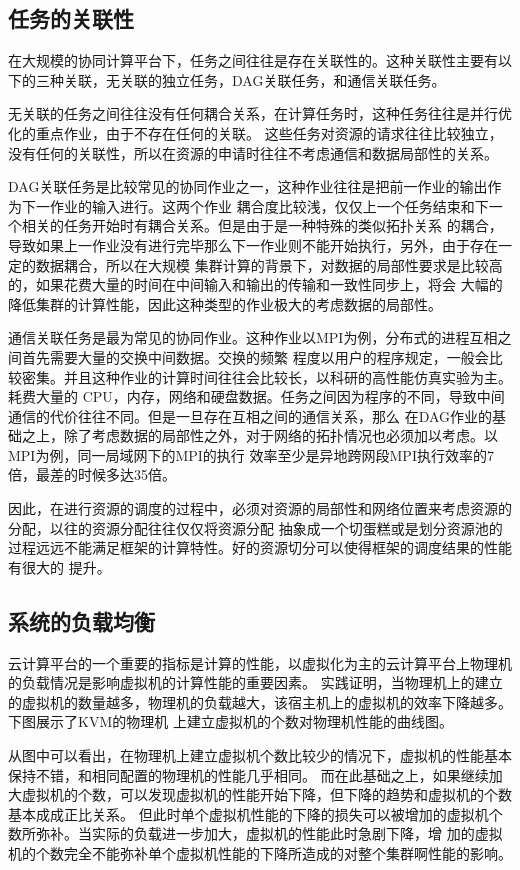 \subsection{任务的关联性}
在大规模的协同计算平台下，任务之间往往是存在关联性的。这种关联性主要有以下的三种关联，无关联的独立任务，DAG关联任务，和通信关联任务。

无关联的任务之间往往没有任何耦合关系，在计算任务时，这种任务往往是并行优化的重点作业，由于不存在任何的关联。
这些任务对资源的请求往往比较独立，没有任何的关联性，所以在资源的申请时往往不考虑通信和数据局部性的关系。

DAG关联任务是比较常见的协同作业之一，这种作业往往是把前一作业的输出作为下一作业的输入进行。这两个作业
耦合度比较浅，仅仅上一个任务结束和下一个相关的任务开始时有耦合关系。但是由于是一种特殊的类似拓扑关系
的耦合，导致如果上一作业没有进行完毕那么下一作业则不能开始执行，另外，由于存在一定的数据耦合，所以在大规模
集群计算的背景下，对数据的局部性要求是比较高的，如果花费大量的时间在中间输入和输出的传输和一致性同步上，将会
大幅的降低集群的计算性能，因此这种类型的作业极大的考虑数据的局部性。

通信关联任务是最为常见的协同作业。这种作业以MPI为例，分布式的进程互相之间首先需要大量的交换中间数据。交换的频繁
程度以用户的程序规定，一般会比较密集。并且这种作业的计算时间往往会比较长，以科研的高性能仿真实验为主。耗费大量的
CPU，内存，网络和硬盘数据。任务之间因为程序的不同，导致中间通信的代价往往不同。但是一旦存在互相之间的通信关系，那么
在DAG作业的基础之上，除了考虑数据的局部性之外，对于网络的拓扑情况也必须加以考虑。以MPI为例，同一局域网下的MPI的执行
效率至少是异地跨网段MPI执行效率的7倍，最差的时候多达35倍。

因此，在进行资源的调度的过程中，必须对资源的局部性和网络位置来考虑资源的分配，以往的资源分配往往仅仅将资源分配
抽象成一个切蛋糕或是划分资源池的过程远远不能满足框架的计算特性。好的资源切分可以使得框架的调度结果的性能有很大的
提升。

\subsection{系统的负载均衡}
云计算平台的一个重要的指标是计算的性能，以虚拟化为主的云计算平台上物理机的负载情况是影响虚拟机的计算性能的重要因素。
实践证明，当物理机上的建立的虚拟机的数量越多，物理机的负载越大，该宿主机上的虚拟机的效率下降越多。下图展示了KVM的物理机
上建立虚拟机的个数对物理机性能的曲线图。

从图中可以看出，在物理机上建立虚拟机个数比较少的情况下，虚拟机的性能基本保持不错，和相同配置的物理机的性能几乎相同。
而在此基础之上，如果继续加大虚拟机的个数，可以发现虚拟机的性能开始下降，但下降的趋势和虚拟机的个数基本成成正比关系。
但此时单个虚拟机性能的下降的损失可以被增加的虚拟机个数所弥补。当实际的负载进一步加大，虚拟机的性能此时急剧下降，增
加的虚拟机的个数完全不能弥补单个虚拟机性能的下降所造成的对整个集群啊性能的影响。


